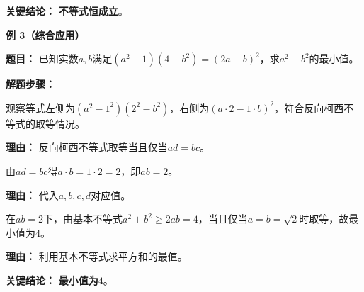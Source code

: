 \begin{examplebox}
	\textbf{\textcolor{CExample}{关键结论：}}
	\textbf{不等式恒成立}。

	\medskip
	\textbf{\textcolor{CExample}{例 3（综合应用）}}

	\textbf{\textcolor{CExample}{题目：}}
	已知实数$a,b$满足$(a^2-1)(4-b^2)= (2a-b)^2$，求$a^2+b^2$的最小值。

	\textbf{\textcolor{CExample}{解题步骤：}}
	\begin{description}[style=nextline, leftmargin=2.8em, labelsep=0.5em, itemsep=0.45em]
		\item[\textbf{第一步（识别等号条件）：}] 观察等式左侧为$(a^2-1^2)(2^2-b^2)$，右侧为$(a\cdot2-1\cdot b)^2$，符合反向柯西不等式的取等情况。
			\par\textbf{理由：}
			反向柯西不等式取等当且仅当$ad=bc$。
		\item[\textbf{第二步（导出关系）：}] 由$ad=bc$得$a\cdot b=1\cdot2=2$，即$ab=2$。
			\par\textbf{理由：}
			代入$a,b,c,d$对应值。
		\item[\textbf{第三步（求最值）：}] 在$ab=2$下，由基本不等式$a^2+b^2\ge 2ab=4$，当且仅当$a=b=\sqrt{2}$时取等，故最小值为$4$。
			\par\textbf{理由：}
			利用基本不等式求平方和的最值。
	\end{description}

	\textbf{\textcolor{CExample}{关键结论：}}
	\textbf{最小值为$4$}。
\end{examplebox}
